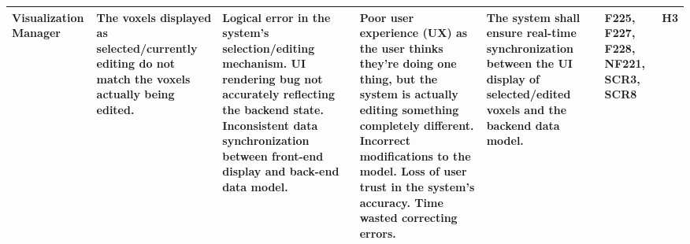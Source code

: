 \documentclass{article}
\begin{document}
\begin{landscape}
\begin{table}[H]
\begin{tabular}{|p{3cm}|p{3cm}|p{3.8cm}|p{3.8cm}|p{5.5cm}|p{2cm}|p{1cm}|}
\hline
Visualization Manager & The voxels displayed as selected/currently editing do not match the voxels actually being edited. & \textbullet{} Logical error in the system's selection/editing mechanism. \newline \textbullet{} UI rendering bug not accurately reflecting the backend state. \newline \textbullet{} Inconsistent data synchronization between front-end display and back-end data model. & \textbullet{} Poor user experience (UX) as the user thinks they're doing one thing, but the system is actually editing something completely different. \newline \textbullet{} Incorrect modifications to the model. \newline \textbullet{} Loss of user trust in the system's accuracy. \newline \textbullet{} Time wasted correcting errors. & The system shall ensure real-time synchronization between the UI display of selected/edited voxels and the backend data model.  & F225, F227, F228, NF221, SCR3, SCR8 & H3 \\
\hline
\end{tabular}
\end{table}


\end{landscape}
\end{document}
